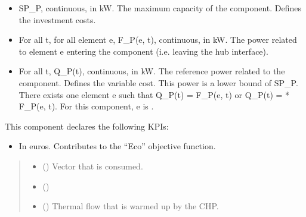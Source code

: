 \documentclass[letterpaper,10pt,english]{sphinxmanual}
\begin{document}
\begin{fulllineitems}
\begin{fulllineitems}
\begin{itemize}
\item {} 
\sphinxAtStartPar
SP\_P, continuous, in kW.
The maximum capacity of the component. Defines the investment costs.

\item {} 
\sphinxAtStartPar
For all t, for all element e, F\_P(e, t), continuous, in kW.
The power related to element e entering the component (i.e. leaving the hub interface).

\item {} 
\sphinxAtStartPar
For all t, Q\_P(t), continuous, in kW.
The reference power related to the component. Defines the variable cost.
This power is a lower bound of SP\_P.
There exists one element e such that Q\_P(t) = F\_P(e, t) or Q\_P(t) = * F\_P(e, t).
For this component, e is .

\end{itemize}

\sphinxAtStartPar
This component declares the following KPIs:
\begin{itemize}
\item {} 
\sphinxAtStartPar
{}
In euros.
Contributes to the “Eco” objective function.

\end{itemize}
\begin{quote}\begin{description}
\begin{itemize}
\item {} 
\sphinxAtStartPar
{} ({\hyperref[\detokenize{generated/tamos.element.FuelVector:tamos.element.FuelVector}]{}}) \textendash{} Vector that is consumed.

\item {} 
\sphinxAtStartPar
{} ({\hyperref[\detokenize{generated/tamos.element.ElectricityVector:tamos.element.ElectricityVector}]{}}) \textendash{} 

\item {} 
\sphinxAtStartPar
{} () \textendash{} Thermal flow that is warmed up by the CHP.


\end{itemize}
\end{description}
\end{quote}
\end{fulllineitems}
\end{fulllineitems}
\end{document}
